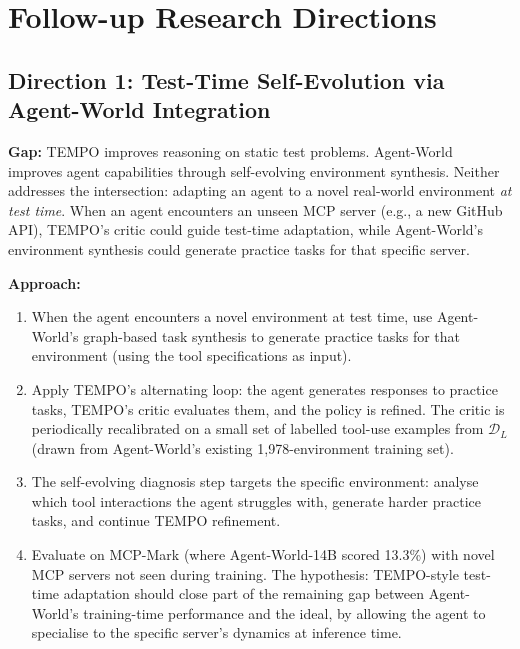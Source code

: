 \documentclass[11pt]{article}
\begin{document}
\section{Follow-up Research Directions}

\subsection{Direction 1: Test-Time Self-Evolution via Agent-World Integration}

\textbf{Gap:} TEMPO improves reasoning on static test problems. Agent-World~\cite{agentworld} improves agent capabilities through self-evolving environment synthesis. Neither addresses the intersection: adapting an agent to a novel real-world environment \textit{at test time}. When an agent encounters an unseen MCP server (e.g., a new GitHub API), TEMPO's critic could guide test-time adaptation, while Agent-World's environment synthesis could generate practice tasks for that specific server.

\textbf{Approach:}
\begin{enumerate}
    \item When the agent encounters a novel environment at test time, use Agent-World's graph-based task synthesis to generate practice tasks for that environment (using the tool specifications as input).

    \item Apply TEMPO's alternating loop: the agent generates responses to practice tasks, TEMPO's critic evaluates them, and the policy is refined. The critic is periodically recalibrated on a small set of labelled tool-use examples from $\mathcal{D}_L$ (drawn from Agent-World's existing 1,978-environment training set).

    \item The self-evolving diagnosis step targets the specific environment: analyse which tool interactions the agent struggles with, generate harder practice tasks, and continue TEMPO refinement.

    \item Evaluate on MCP-Mark (where Agent-World-14B scored 13.3\%) with novel MCP servers not seen during training. The hypothesis: TEMPO-style test-time adaptation should close part of the remaining gap between Agent-World's training-time performance and the ideal, by allowing the agent to specialise to the specific server's dynamics at inference time.
\end{enumerate}
\end{document}
